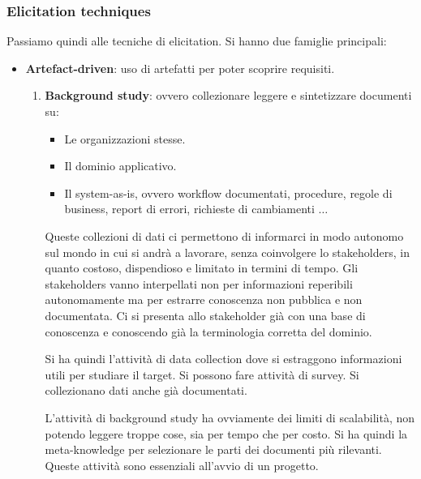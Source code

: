 \subsubsection{Elicitation techniques}
Passiamo quindi alle tecniche di elicitation. Si hanno due famiglie principali:
\begin{itemize}
      \item \textbf{Artefact-driven}: uso di artefatti per poter scoprire requisiti.
            \begin{enumerate}
                  \item \textbf{Background study}: ovvero collezionare leggere
                        e sintetizzare documenti su:
                        \begin{itemize}
                              \item Le organizzazioni stesse.
                              \item Il dominio applicativo.
                              \item Il system-as-is, ovvero workflow documentati,
                                    procedure, regole di business, report di
                                    errori, richieste di cambiamenti $\dots$
                        \end{itemize}
                        Queste collezioni di dati ci permettono di informarci in
                        modo autonomo sul mondo in cui si andrà a lavorare, senza
                        coinvolgere lo stakeholders, in quanto costoso, dispendioso
                        e limitato in termini di tempo. Gli stakeholders vanno
                        interpellati non per informazioni reperibili autonomamente
                        ma per estrarre conoscenza non pubblica e non documentata.
                        Ci si presenta allo stakeholder già con una base di
                        conoscenza e conoscendo già la terminologia corretta del
                        dominio.

                        Si ha quindi l'attività di data collection dove si
                        estraggono informazioni utili per studiare il target. Si
                        possono fare attività di survey. Si collezionano dati anche
                        già documentati.

                        L'attività di background study ha ovviamente dei limiti
                        di scalabilità, non potendo leggere troppe cose, sia per
                        tempo che per costo. Si ha quindi la meta-knowledge per
                        selezionare le parti dei documenti più rilevanti.
                        Queste attività sono essenziali all'avvio di un progetto.


\end{enumerate}
\end{itemize}
